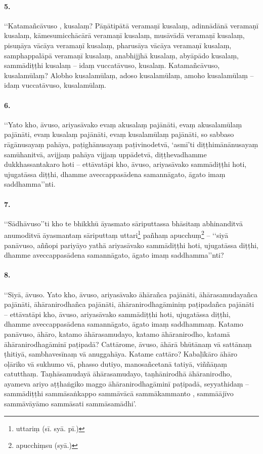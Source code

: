 \paragraph{5.} ‘‘Katamañcāvuso , kusalaṃ? Pāṇātipātā veramaṇī kusalaṃ, adinnādānā veramaṇī kusalaṃ, kāmesumicchācārā veramaṇī kusalaṃ, musāvādā veramaṇī kusalaṃ, pisuṇāya vācāya veramaṇī kusalaṃ, pharusāya vācāya veramaṇī kusalaṃ, samphappalāpā veramaṇī kusalaṃ, anabhijjhā kusalaṃ, abyāpādo kusalaṃ, sammādiṭṭhi kusalaṃ – idaṃ vuccatāvuso, kusalaṃ. Katamañcāvuso, kusalamūlaṃ? Alobho kusalamūlaṃ, adoso kusalamūlaṃ, amoho kusalamūlaṃ – idaṃ vuccatāvuso, kusalamūlaṃ.

\paragraph{6.} ‘‘Yato kho, āvuso, ariyasāvako evaṃ akusalaṃ pajānāti, evaṃ akusalamūlaṃ pajānāti, evaṃ kusalaṃ pajānāti, evaṃ kusalamūlaṃ pajānāti, so sabbaso rāgānusayaṃ pahāya, paṭighānusayaṃ paṭivinodetvā, ‘asmī’ti diṭṭhimānānusayaṃ samūhanitvā, avijjaṃ pahāya vijjaṃ uppādetvā, diṭṭhevadhamme dukkhassantakaro hoti – ettāvatāpi kho, āvuso, ariyasāvako sammādiṭṭhi hoti, ujugatāssa diṭṭhi, dhamme aveccappasādena samannāgato, āgato imaṃ saddhamma’’nti.

\paragraph{7.} ‘‘Sādhāvuso’’ti kho te bhikkhū āyasmato sāriputtassa bhāsitaṃ abhinanditvā anumoditvā āyasmantaṃ sāriputtaṃ uttari\footnote{uttariṃ (sī. syā. pī.)} pañhaṃ apucchuṃ\footnote{apucchiṃsu (syā.)} – ‘‘siyā panāvuso, aññopi pariyāyo yathā ariyasāvako sammādiṭṭhi hoti, ujugatāssa diṭṭhi, dhamme aveccappasādena samannāgato, āgato imaṃ saddhamma’’nti?

\paragraph{8.} ‘‘Siyā, āvuso. Yato kho, āvuso, ariyasāvako āhārañca pajānāti, āhārasamudayañca pajānāti, āhāranirodhañca pajānāti, āhāranirodhagāminiṃ paṭipadañca pajānāti – ettāvatāpi kho, āvuso, ariyasāvako sammādiṭṭhi hoti, ujugatāssa diṭṭhi, dhamme aveccappasādena samannāgato, āgato imaṃ saddhammaṃ. Katamo panāvuso, āhāro, katamo āhārasamudayo, katamo āhāranirodho, katamā āhāranirodhagāminī paṭipadā? Cattārome, āvuso, āhārā bhūtānaṃ vā sattānaṃ ṭhitiyā, sambhavesīnaṃ vā anuggahāya. Katame cattāro? Kabaḷīkāro āhāro oḷāriko vā sukhumo vā, phasso dutiyo, manosañcetanā tatiyā, viññāṇaṃ catutthaṃ. Taṇhāsamudayā āhārasamudayo, taṇhānirodhā āhāranirodho, ayameva ariyo aṭṭhaṅgiko maggo āhāranirodhagāminī paṭipadā, seyyathidaṃ – sammādiṭṭhi sammāsaṅkappo sammāvācā sammākammanto , sammāājīvo sammāvāyāmo sammāsati sammāsamādhi’.

